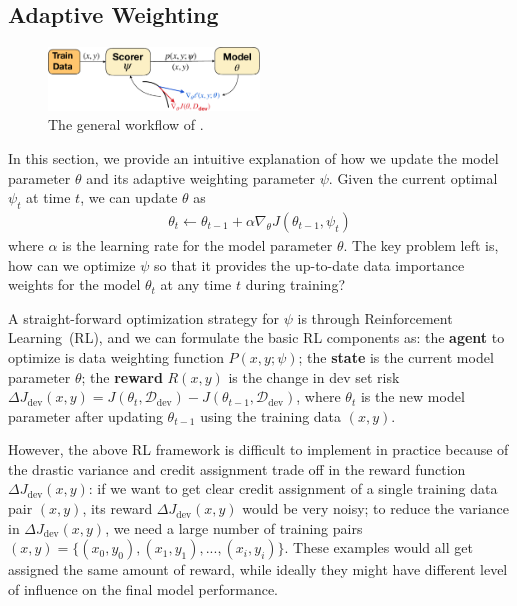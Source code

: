 \subsection{\label{sec:efficient_reward} Adaptive Weighting}
\begin{figure}
    \centering
    \includegraphics[width=0.5\textwidth]{figs/method_plot_crop.pdf}
    \caption{The general workflow of \dds.}
    \label{fig:method}
\end{figure}

In this section, we provide an intuitive explanation of how we update the model parameter $\theta$ and its adaptive weighting parameter $\psi$. Given the current optimal $\psi_t$ at time $t$, we can update $\theta$ as
\begin{align}
    \label{eqn:theta_update}
    \theta_t \leftarrow \theta_{t-1} + \alpha \nabla_\theta J(\theta_{t-1}, \psi_t)
\end{align}
where $\alpha$ is the learning rate for the model parameter $\theta$. The key problem left is, how can we optimize $\psi$ so that it provides the up-to-date data importance weights for the model $\theta_t$ at any time $t$ during training?

A straight-forward optimization strategy for $\psi$ is through Reinforcement Learning~(RL), and we can formulate the basic RL components as: the \textbf{agent} to optimize is data weighting function $P(x, y; \psi)$; the \textbf{state} is the current model parameter $\theta$; the \textbf{reward} $R(x, y)$ is the change in dev set risk $\Delta J_{\text{dev}}(x, y) = J(\theta_t, \mathcal{D}_\text{dev}) - J(\theta_{t-1}, \mathcal{D}_\text{dev})$, where $\theta_t$ is the new model parameter after updating $\theta_{t-1}$ using the training data $(x, y)$.

However, the above RL framework is difficult to implement in practice because of the drastic variance and credit assignment trade off in the reward function $\Delta J_{\text{dev}}(x, y)$: if we want to get clear credit assignment of a single training data pair $(x, y)$, its reward $\Delta J_{\text{dev}}(x, y)$ would be very noisy; to reduce the variance in $\Delta J_{\text{dev}}(x, y)$, we need a large number of training pairs $(x, y) = \{(x_0, y_0), (x_1, y_1), ..., (x_i, y_i)\}$. These examples would all get assigned the same amount of reward, while ideally they might have different level of influence on the final model performance.

